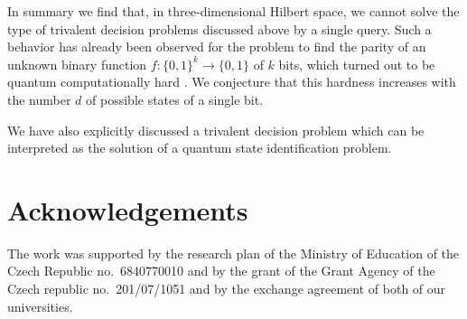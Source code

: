 \documentclass[fleqn,twoside]{article}
\begin{document}
In summary we find that, in three-dimensional Hilbert space, we cannot solve the type of trivalent decision problems
discussed above by a single query.
Such a behavior has already been observed for the problem to find the
parity of an unknown binary function $f:\{0,1\}^k \rightarrow \{0,1\}$ of $k$ bits,
which turned out to be quantum computationally hard
\cite{Farhi-98,bbcmw-01,Miao-2001,orus-04,stadelhofer-05}.
We conjecture that this hardness increases with the number $d$ of possible states of a single bit.

We have also explicitly discussed a trivalent decision problem which can be interpreted as the solution of a quantum
state identification problem.



\section *{Acknowledgements}


The work was supported by the research plan of the Ministry of Education of
the Czech Republic no.~6840770010 and by the grant of the Grant Agency of
the Czech republic no.~201/07/1051 and by the exchange agreement
of both of our universities.




%
\end{document}
